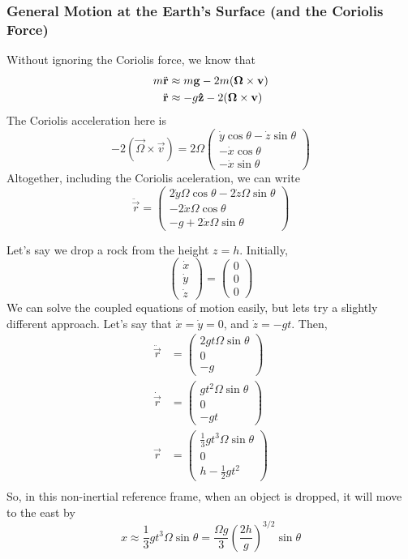 \documentclass[a4paper]{article}
\begin{document}
\subsubsection{General Motion at the Earth's Surface (and the Coriolis Force)}
Without ignoring the Coriolis force, we know that
\begin{align*}
	m\ddot{\boldsymbol{\mathbf{r}}} &\approx m\boldsymbol{\mathbf{g}}-2m(\boldsymbol{\mathbf{\Omega}}\times\boldsymbol{\mathbf{v}})\\
	\ddot{\boldsymbol{\mathbf{r}}} &\approx -g\boldsymbol{\mathbf{\hat{z}}}-2(\boldsymbol{\mathbf{\Omega}}\times\boldsymbol{\mathbf{v}})
\end{align*}
The Coriolis acceleration here is
\[ -2(\vec{\Omega}\times\vec{v}) = 2\Omega\begin{pmatrix}
	\dot{y}\cos\theta-\dot{z}\sin\theta\\
	-\dot{x}\cos\theta\\
	-\dot{x}\sin\theta
\end{pmatrix}
\]
Altogether, including the Coriolis aceleration, we can write 
\[ \ddot{\vec{r}} = \begin{pmatrix}
		2\dot{y}\Omega\cos\theta-2\dot{z}\Omega\sin\theta\\
		-2\dot{x}\Omega\cos\theta\\
		-g+2\dot{x}\Omega\sin\theta
	\end{pmatrix}
\]

\begin{eg}
	Let's say we drop a rock from the height $z=h$. Initially,
	\[ \begin{pmatrix}\dot{x}\\\dot{y}\\\dot{z}\end{pmatrix} = 
	\begin{pmatrix}0\\0\\0\end{pmatrix} \]
	We can solve the coupled equations of motion easily, but lets try a
	slightly different approach. Let's say that
	$\dot{x}=\dot{y}=0$, and $\dot{z}=-gt$. Then,
	\begin{align*}
		\ddot{\vec{r}} &=
		\begin{pmatrix}
			2gt\Omega\sin\theta\\
			0\\
			-g
		\end{pmatrix}\\
		\dot{\vec{r}} &=
		\begin{pmatrix}
			gt^2\Omega\sin\theta\\
			0\\
			-gt
		\end{pmatrix}\\
		\vec{r} &=
		\begin{pmatrix}
			\frac{1}{3}gt^3\Omega\sin\theta\\
			0\\
			h-\frac{1}{2}gt^2
		\end{pmatrix}\\
	\end{align*}
	So, in this non-inertial reference frame, when an object is dropped, it
	will move to the east by
	\[ x\approx \frac{1}{3}gt^3\Omega\sin\theta = \frac{\Omega g}{3}
	\left(\frac{2h}{g}\right)^{3/2}\sin\theta \]
\end{eg}
\end{document}
